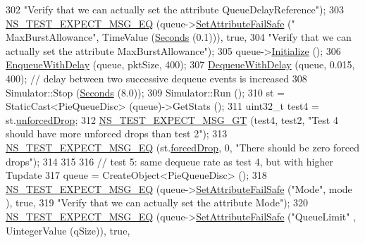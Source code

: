 \begin{DoxyCode}
302                          \textcolor{stringliteral}{"Verify that we can actually set the attribute QueueDelayReference"});
303   \hyperlink{group__testing_ga7304ba46a28d8cf08dfdfd6499cf7068}{NS\_TEST\_EXPECT\_MSG\_EQ} (queue->\hyperlink{classns3_1_1ObjectBase_aa7d333004e970f925a4ed5df275541b5}{SetAttributeFailSafe} (\textcolor{stringliteral}{"
      MaxBurstAllowance"}, TimeValue (\hyperlink{group__timecivil_ga33c34b816f8ff6628e33d5c8e9713b9e}{Seconds} (0.1))), \textcolor{keyword}{true},
304                          \textcolor{stringliteral}{"Verify that we can actually set the attribute MaxBurstAllowance"});
305   queue->\hyperlink{classns3_1_1Object_af4411cb29971772fcd09203474a95078}{Initialize} ();
306   \hyperlink{classPieQueueDiscTestCase_a6d837dbfe3af8f4a7a1ca4e6ecbbf54e}{EnqueueWithDelay} (queue, pktSize, 400);
307   \hyperlink{classPieQueueDiscTestCase_ac95d22c3ac6ef3a873d70a663fd964e3}{DequeueWithDelay} (queue, 0.015, 400); \textcolor{comment}{// delay between two successive dequeue events is
       increased}
308   Simulator::Stop (\hyperlink{group__timecivil_ga33c34b816f8ff6628e33d5c8e9713b9e}{Seconds} (8.0));
309   Simulator::Run ();
310   st = StaticCast<PieQueueDisc> (queue)->GetStats ();
311   uint32\_t test4 = st.\hyperlink{structns3_1_1PieQueueDisc_1_1Stats_afe4c9f6e4c910cf47d475ff5d29d5bb0}{unforcedDrop};
312   \hyperlink{group__testing_ga6ba43672d44c1e85acfb1daf2af66612}{NS\_TEST\_EXPECT\_MSG\_GT} (test4, test2, \textcolor{stringliteral}{"Test 4 should have more unforced drops than
       test 2"});
313   \hyperlink{group__testing_ga7304ba46a28d8cf08dfdfd6499cf7068}{NS\_TEST\_EXPECT\_MSG\_EQ} (st.\hyperlink{structns3_1_1PieQueueDisc_1_1Stats_a40eea66d9bc2ce766df9390776eb88a9}{forcedDrop}, 0, \textcolor{stringliteral}{"There should be zero forced
       drops"});
314 
315 
316   \textcolor{comment}{// test 5: same dequeue rate as test 4, but with higher Tupdate}
317   queue = CreateObject<PieQueueDisc> ();
318   \hyperlink{group__testing_ga7304ba46a28d8cf08dfdfd6499cf7068}{NS\_TEST\_EXPECT\_MSG\_EQ} (queue->\hyperlink{classns3_1_1ObjectBase_aa7d333004e970f925a4ed5df275541b5}{SetAttributeFailSafe} (\textcolor{stringliteral}{"Mode"}, mode
      ), \textcolor{keyword}{true},
319                          \textcolor{stringliteral}{"Verify that we can actually set the attribute Mode"});
320   \hyperlink{group__testing_ga7304ba46a28d8cf08dfdfd6499cf7068}{NS\_TEST\_EXPECT\_MSG\_EQ} (queue->\hyperlink{classns3_1_1ObjectBase_aa7d333004e970f925a4ed5df275541b5}{SetAttributeFailSafe} (\textcolor{stringliteral}{"QueueLimit"}
      , UintegerValue (qSize)), \textcolor{keyword}{true},

\end{DoxyCode}
